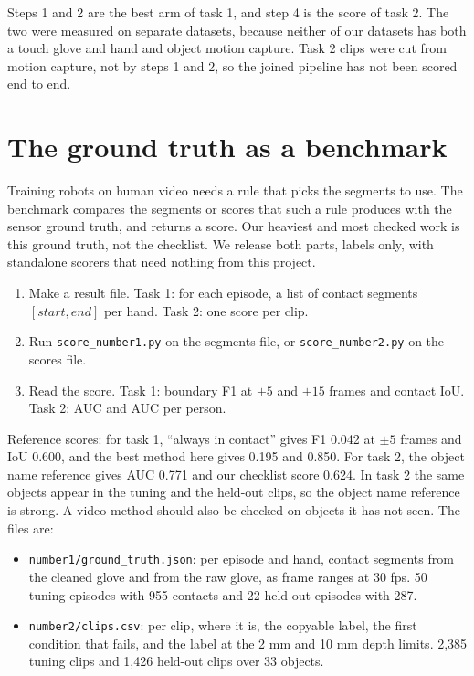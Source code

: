 \documentclass[10pt,twocolumn,letterpaper]{article}
\begin{document}
Steps 1 and 2 are the best arm of task 1, and step 4 is the score of task 2.
The two were measured on separate datasets, because neither of our datasets
has both a touch glove and hand and object motion capture. Task 2 clips were cut from
motion capture, not by steps 1 and 2, so the joined pipeline has not been
scored end to end.

\section{The ground truth as a benchmark}
\label{sec:bench}

Training robots on human video needs a rule that picks the segments to use.
The benchmark compares the segments or scores that such a rule produces with
the sensor ground truth, and returns a score. Our heaviest and most checked
work is this ground truth, not the checklist. We release both parts, labels
only, with standalone scorers that need nothing from this project.

\begin{enumerate}
\item Make a result file. Task 1: for each episode, a list of contact segments
$[\mathit{start}, \mathit{end}]$ per hand. Task 2: one score per clip.
\item Run \texttt{score\_number1.py} on the segments file, or
\texttt{score\_number2.py} on the scores file.
\item Read the score. Task 1: boundary F1 at $\pm 5$ and $\pm 15$ frames and
contact IoU. Task 2: AUC and AUC per person.
\end{enumerate}

Reference scores: for task 1, ``always in contact'' gives F1 0.042 at
$\pm 5$ frames and IoU 0.600, and the best method here gives 0.195 and 0.850.
For task 2, the object name reference gives AUC 0.771 and our checklist score
0.624. In task 2 the same objects appear in the tuning and the held-out
clips, so the object name reference is strong. A video method should also be
checked on objects it has not seen. The files are:

\begin{itemize}
\item \texttt{number1/ground\_truth.json}: per episode and hand, contact
segments from the cleaned glove and from the raw glove, as frame ranges at
30 fps. 50 tuning episodes with 955 contacts and 22 held-out episodes with 287.
\item \texttt{number2/clips.csv}: per clip, where it is, the copyable label,
the first condition that fails, and the label at the 2 mm and 10 mm depth
limits. 2,385 tuning clips and 1,426 held-out clips over 33 objects.
\end{itemize}
\end{document}
